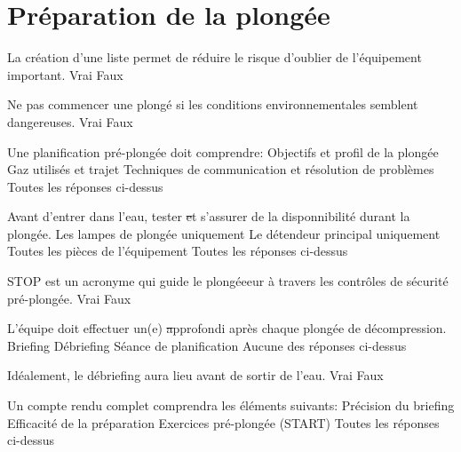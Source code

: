 \documentclass[english,10pt,a4paper,twoside]{article}
\begin{document}
	\section{Préparation de la plongée}
	\begin{outline}
		\1 La création d'une liste permet de réduire le risque d'oublier de l'équipement important.
			\2 Vrai
			\2 Faux

		\1 Ne pas commencer une plongé si les conditions environnementales semblent dangereuses.
			\2 Vrai
			\2 Faux

		\1 Une planification pré-plongée doit comprendre:
			\2 Objectifs et profil de la plongée
			\2 Gaz utilisés et trajet
			\2 Techniques de communication et résolution de problèmes
			\2 Toutes les réponses ci-dessus

		\1 Avant d'entrer dans l'eau, tester \st et s'assurer de la disponnibilité durant la plongée.
			\2 Les lampes de plongée uniquement
			\2 Le détendeur principal uniquement
			\2 Toutes les pièces de l'équipement
			\2 Toutes les réponses ci-dessus

		\1 STOP est un acronyme qui guide le plongéeeur à travers les contrôles de sécurité pré-plongée.
			\2 Vrai
			\2 Faux

		\1 L'équipe doit effectuer un(e) \st approfondi après chaque plongée de décompression.
			\2 Briefing
			\2 Débriefing
			\2 Séance de planification
			\2 Aucune des réponses ci-dessus

		\1 Idéalement, le débriefing aura lieu avant de sortir de l'eau.
			\2 Vrai
			\2 Faux

		\1 Un compte rendu complet comprendra les éléments suivants:
			\2 Précision du briefing
			\2 Efficacité de la préparation
			\2 Exercices pré-plongée (START)
			\2 Toutes les réponses ci-dessus
	\end{outline}
	\vfill
	\pagebreak
\end{document}
